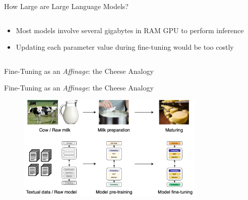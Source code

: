 \documentclass[11pt,aspectratio=169]{beamer}
\begin{document}
\begin{frame}{How Large are Large Language Models?}
\begin{columns}
\begin{column}{0.4\linewidth}
            \vspace{0.5cm}
            \begin{itemize}
                \item <2-> Most models involve several gigabytes in RAM GPU to perform inference
                \item <2-> Updating each parameter value during fine-tuning would be too costly
            \end{itemize}
            \vspace{0.3cm}
        \end{column}
    \end{columns}
    
    
\end{frame}

\begin{frame}{Fine-Tuning as an \textsl{Affinage}: the Cheese Analogy}
\end{frame}

\begin{frame}{Fine-Tuning as an \textsl{Affinage}: the Cheese Analogy}
    \begin{figure}
        \centering
        \includegraphics[width=0.8\textwidth]{pretrain_finetune_2.png}
    \end{figure}
\end{frame}
\end{document}
